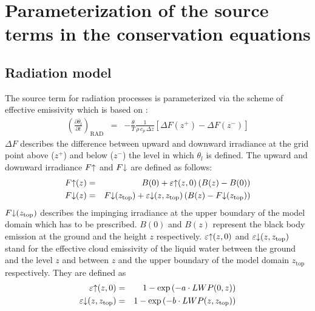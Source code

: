 \documentclass[11pt,a4paper]{scrartcl}
\begin{document}
\section{Parameterization of the source terms in the conservation equations}
\subsection{Radiation model}
The source term for radiation processes is parameterized via the scheme of effective emissivity which is based on \cite{cox76}:
\begin{eqnarray}
 \left(\frac{\partial \overline\theta_{l}}{\partial t}\right)_{\mathrm{RAD}} & = &
  -\frac{\theta}{T}\frac{1}{\rho \,c_{p}\,\Delta z}\left[\Delta F(z^{+})-\Delta F(z^{-})\right]
 \label{eq:radiation_term}
\end{eqnarray}
$\Delta F$ describes the difference between upward and downward irradiance at the grid point above ($z^{+}$) and below ($z^{-}$) 
the level in which $\theta_{l}$ is defined.
\newline
The upward and downward irradiance $F\textnormal{\textuparrow}$ and $F\textnormal{\textdownarrow}$ are defined as follows:
\begin{eqnarray}
 \label{eq:F_up}
  F\textnormal{\textuparrow}(z) & = &
  B(0) + \varepsilon\textnormal{\textuparrow}(z,0)\left(B(z)-B(0)\right) \\
 \label{eq:F_down} 
  F\textnormal{\textdownarrow}(z) & = &
  F\textnormal{\textdownarrow}(z_{\mathrm{top}})
  + \varepsilon\textnormal{\textdownarrow}(z,z_{\mathrm{top}})\left(B(z)-F\textnormal{\textdownarrow}(z_{\mathrm{top}})\right)
\end{eqnarray}
$F\textnormal{\textdownarrow}(z_{\mathrm{top}})$ describes the impinging irradiance at the upper boundary of the model domain which has to be 
prescribed. $B(0)$ and $B(z)$ represent the black body emission at the ground and the height $z$ respectively. 
$\varepsilon\textnormal{\textuparrow}(z,0)$ and $\varepsilon\textnormal{\textdownarrow}(z,z_{\mathrm{top}})$ stand for the effective 
cloud emissivity of the liquid water between the ground and the level $z$ and between $z$ and the upper boundary of the model domain 
$z_{\mathrm{top}}$ respectively. They are defined as 
\begin{eqnarray}
 \label{eq:epsilon_up}
  \varepsilon\textnormal{\textuparrow}(z,0) & = & 
   1- \exp\left(-a\cdot LWP(0,z)\right)\\
 \label{eq:epsilon_down} 
  \varepsilon\textnormal{\textdownarrow}(z,z_{\mathrm{top}}) & = & 
   1- \exp\left(-b\cdot LWP(z,z_{\mathrm{top}})\right)
\end{eqnarray}
\end{document}

